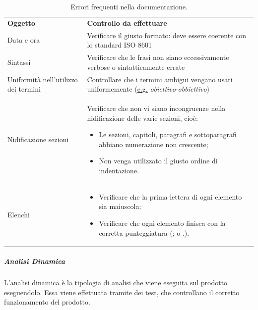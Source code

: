 \documentclass[../norme-di-progetto.tex]{subfiles}
\begin{document}
\begin{table}[H]
\centering
\begin{tabular}{p{5cm}p{10cm}}
\textbf{Oggetto}           & \textbf{Controllo da effettuare}      \\
Data e ora                              & Verificare il giusto formato: deve essere coerente con lo standard ISO 8601 \\
Sintassi                          & Verificare che le frasi non siano eccessivamente verbose o sintatticamente errate       \\
Uniformità nell'utilizzo dei termini & Controllare che i termini ambigui vengano usati uniformemente (\underline{e.g.} \textit{obiettivo}-\textit{obbiettivo}) \\
Nidificazione sezioni            & Verificare che non vi siano incongruenze nella nidificazione delle varie sezioni, cioè: \begin{itemize}
  \item Le sezioni, capitoli, paragrafi e sottoparagrafi abbiano numerazione non crescente;
  \item Non venga utilizzato il giusto ordine di indentazione.
\end{itemize}       \\
Elenchi                           & \begin{itemize}
  \item Verificare che la prima lettera di ogni elemento sia maiuscola;
  \item Verificare che ogni elemento finisca con la corretta punteggiatura (; o .).
\end{itemize}       \\
\end{tabular}
\caption{Errori frequenti nella documentazione.}
\end{table}

\subparagraph{Analisi Dinamica}
L'analisi dinamica è la tipologia di analisi che viene eseguita sul prodotto eseguendolo. Essa viene effettuata tramite dei test, che controllano il corretto funzionamento del prodotto.
\end{document}
